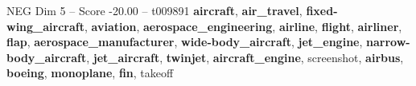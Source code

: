 \begin{textsample}{NEG Dim 5 – Score -20.00 – t009891}  \label{ex:f5_neg_014}
\textbf{aircraft}, \textbf{air\_travel}, \textbf{fixed-wing\_aircraft}, \textbf{aviation}, \textbf{aerospace\_engineering}, \textbf{airline}, \textbf{flight}, \textbf{airliner}, \textbf{flap}, \textbf{aerospace\_manufacturer}, \textbf{wide-body\_aircraft}, \textbf{jet\_engine}, \textbf{narrow-body\_aircraft}, \textbf{jet\_aircraft}, \textbf{twinjet}, \textbf{aircraft\_engine}, screenshot, \textbf{airbus}, \textbf{boeing}, \textbf{monoplane}, \textbf{fin}, takeoff

\end{textsample}
